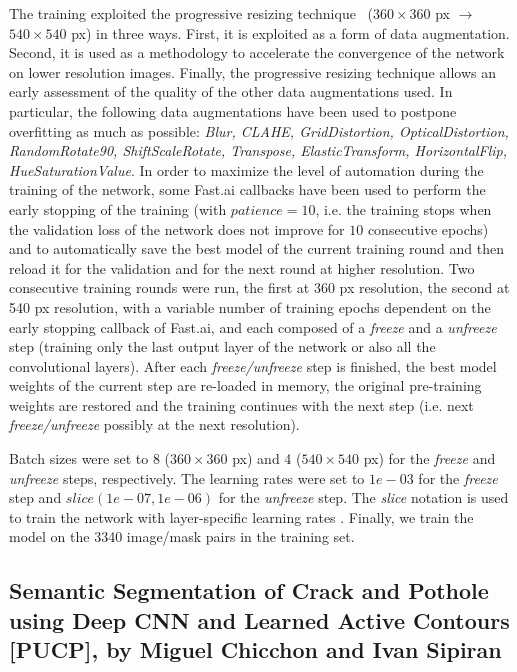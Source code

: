 \documentclass[twocolumn]{article}
\newcommand{\PUCP}[0]{PUCP}\newcommand{\HCMUS}[0]{HCMUS}\newcommand{\baseline}[0]{Baseline}
\begin{document}
The training exploited the progressive resizing technique~\cite{cellular_super_resolution} ($360\times360$ px $\rightarrow$ $540\times540$ px) in three ways. First, it is exploited as a form of data augmentation. Second, it is used as a methodology to accelerate the convergence of the network on lower resolution images. Finally, the progressive resizing technique allows an early assessment of the quality of the other data augmentations used. In particular, the following data augmentations have been used to postpone overfitting as much as possible: \emph{Blur, CLAHE, GridDistortion, OpticalDistortion, RandomRotate90, ShiftScaleRotate, Transpose, ElasticTransform, HorizontalFlip, HueSaturationValue}. 
In order to maximize the level of automation during the training of the network, some Fast.ai callbacks have been used to perform the early stopping of the training (with $patience = 10$, i.e. the training stops when the validation loss of the network does not improve for $10$ consecutive epochs) and to automatically save the best model of the current training round and then reload it for the validation and for the next round at higher resolution. 
Two consecutive training rounds were run, the first at 360 px resolution, the second at 540 px resolution, with a variable number of training epochs dependent on the early stopping callback of Fast.ai, and each composed of a \textit{freeze} and a \textit{unfreeze} step (training only the last output layer of the network or also all the convolutional layers). After each \textit{freeze/unfreeze} step is finished, the best model weights of the current step are re-loaded in memory, the original pre-training weights are restored and the training continues with the next step (i.e. next \textit{freeze/unfreeze} possibly at the next resolution).

Batch sizes were set to 8 ($360\times360$ px) and 4 ($540\times540$ px) for the \emph{freeze} and \emph{unfreeze} steps, respectively. The learning rates were set to $1e-03$ for the \emph{freeze} step and $slice(1e-07, 1e-06)$ for the \emph{unfreeze} step. The \emph{slice} notation is used to train the network with layer-specific learning rates \cite{layer-specific-learning-rates}. Finally, we train the model on the 3340 image/mask pairs in the training set.




\subsection{Semantic Segmentation of Crack and Pothole using Deep CNN and Learned Active Contours [\PUCP{}], by Miguel Chicchon and Ivan Sipiran}
\end{document}
